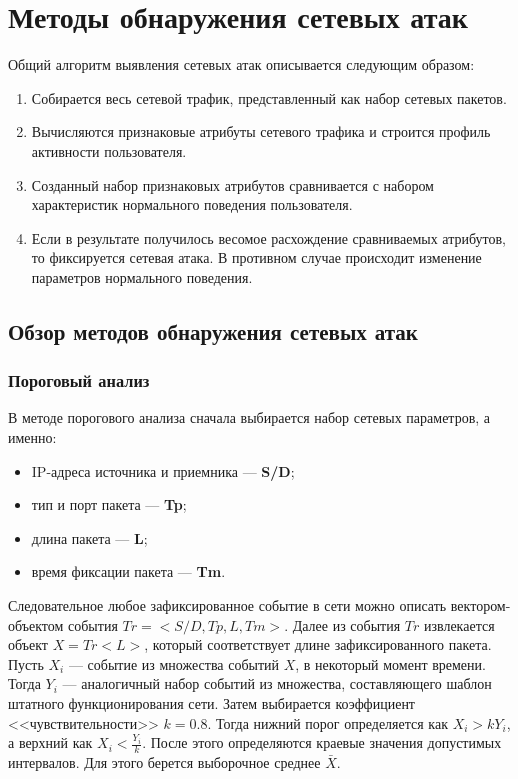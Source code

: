 \chapter{Методы обнаружения сетевых атак}


Общий алгоритм выявления сетевых атак описывается следующим образом: 

\begin{enumerate}
    \item Собирается весь сетевой трафик, представленный как набор сетевых пакетов.
    \item Вычисляются признаковые атрибуты сетевого трафика и строится профиль активности пользователя.
    \item Созданный набор признаковых атрибутов сравнивается с набором характеристик нормального поведения пользователя.
    \item Если в результате получилось весомое расхождение сравниваемых атрибутов, то фиксируется сетевая атака. В противном случае происходит изменение параметров нормального поведения.
\end{enumerate}


\section{Обзор методов обнаружения сетевых атак}

\subsection*{Пороговый анализ}

В методе порогового анализа \cite{eight} сначала выбирается набор сетевых параметров, а именно:

\begin{itemize}
    \item IP-адреса источника и приемника --- \textbf{S/D};
    \item тип и порт пакета --- \textbf{Tp};
    \item длина пакета --- \textbf{L};
    \item время фиксации пакета --- \textbf{Tm}.
\end{itemize}

Следовательное любое зафиксированное событие в сети можно описать вектором-объектом события $Tr = <S/D,  Tp, L, Tm>$.
Далее из события $Tr$ извлекается объект $X = Tr<L>$, который соответствует длине зафиксированного пакета. Пусть $X_i$ --- событие из множества событий $X$, в некоторый момент времени. Тогда $Y_i$ --- аналогичный набор событий из множества, составляющего шаблон штатного функционирования сети. Затем выбирается коэффициент <<чувствительности>> $k = 0.8$. Тогда нижний порог определяется как $X_i > k Y_i$, а верхний как $X_i < \frac{Y_i}{k}$. После этого определяются краевые значения допустимых интервалов. Для этого берется выборочное среднее $\bar{X}$.

